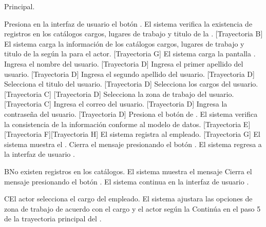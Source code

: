 \begin{UCtrayectoria}{Principal.}
	
	\UCpaso[\UCactor] Presiona en la interfaz de usuario  el botón \IUbutton{+}.
	\UCpaso  El sistema verifica la existencia de registros en los catálogos cargos, lugares de trabajo y titulo de la . [Trayectoria B] 
	\UCpaso El sistema carga la información de los catálogos cargos, lugares de trabajo y titulo de la  según la  para el actor. [Trayectoria G]
	\UCpaso El sistema carga la pantalla  . 
	\UCpaso[\UCactor] Ingresa el nombre del usuario.  [Trayectoria D] 
	\UCpaso[\UCactor] Ingresa el primer apellido del usuario.  [Trayectoria D]
	\UCpaso[\UCactor] Ingresa el segundo apellido del usuario.  [Trayectoria D]  
	\UCpaso[\UCactor] Selecciona el titulo del usuario.  [Trayectoria D]
	\UCpaso[\UCactor] Selecciona los cargos del usuario. [Trayectoria C]  [Trayectoria D] 
	\UCpaso[\UCactor] Selecciona la zona de trabajo del usuario. [Trayectoria C]  
	\UCpaso[\UCactor] Ingresa el correo del usuario.  [Trayectoria D] 
	\UCpaso[\UCactor] Ingresa la contraseña del usuario.  [Trayectoria D]
	\UCpaso[\UCactor]  Presiona el botón de . 
	\UCpaso El sistema verifica la consistencia de la información conforme al modelo de datos. [Trayectoria E] [Trayectoria F][Trayectoria H]
	\UCpaso El sistema registra al empleado. [Trayectoria G]
	\UCpaso  El sistema muestra el .    
	\UCpaso[\UCactor] Cierra el mensaje presionando el botón .
	\UCpaso El sistema regresa a la interfaz de usuario .
\end{UCtrayectoria}


\begin{UCtrayectoriaA}{B}{No existen registros en los catálogos.}
	\UCpaso El sistema muestra el mensaje 
	\UCpaso[\UCactor] Cierra el mensaje presionando el botón .
	\UCpaso El sistema continua en la interfaz de usuario .
\end{UCtrayectoriaA}

\begin{UCtrayectoriaA}{C}{El actor selecciona el cargo del empleado.}
	\UCpaso     El sistema ajustara las opciones de zona de trabajo de acuerdo con el cargo y el actor según la 
	\UCpaso Continúa en el paso 5 de la trayectoria principal del .
\end{UCtrayectoriaA}


